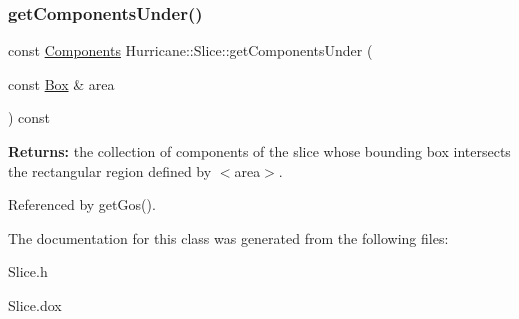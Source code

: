 \subsubsection{\texorpdfstring{get\+Components\+Under()}{getComponentsUnder()}}
{\footnotesize\ttfamily const \hyperlink{namespaceHurricane_a7d26d99aeb5dd6d70d51bd35d2473e72}{Components} Hurricane\+::\+Slice\+::get\+Components\+Under (\begin{DoxyParamCaption}\item[{const \hyperlink{classHurricane_1_1Box}{Box} \&}]{area }\end{DoxyParamCaption}) const}

{\bfseries Returns\+:} the collection of components of the slice whose bounding box intersects the rectangular region defined by {\ttfamily $<$area$>$}. 

Referenced by get\+Gos().



The documentation for this class was generated from the following files\+:\begin{DoxyCompactItemize}
\item 
Slice.\+h\item 
Slice.\+dox\end{DoxyCompactItemize}
